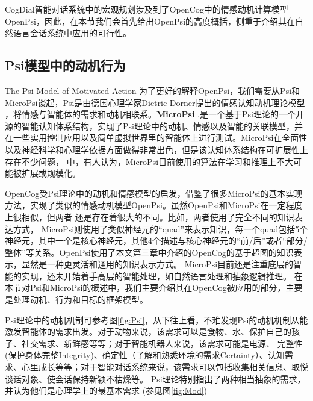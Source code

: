       CogDial智能对话系统中的宏观规划涉及到了OpenCog中的情感动机计算模型OpenPsi，因此，在本节我们会首先给出OpenPsi的高度概括，侧重于介绍其在自然语言会话系统中应用的可行性。

\subsection{Psi模型中的动机行为}{The Psi Model of Motivated Action}
       为了更好的解释OpenPsi，我们需要从Psi和MicroPsi谈起，Psi是由德国心理学家Dietric Dorner提出的情感认知动机理论模型 \cite{Dorner2002}，将情感与智能体的需求和动机相联系。{\bf MicroPsi} \cite{Bach2009},是一个基于Psi理论的一个开源的智能认知体系结构，实现了Psi理论中的动机、情感以及智能的关联模型，并在一些实用控制应用以及简单虚拟世界里的智能体上进行测试。MicroPsi在全面性以及神经科学和心理学依据方面做得非常出色，但是该认知体系结构在可扩展性上存在不少问题， \cite{EGI1}中，有人认为，MicroPsi目前使用的算法在学习和推理上不大可能被扩展或规模化。

       OpenCog受Psi理论中的动机和情感模型的启发，借鉴了很多MicroPsi的基本实现方法，实现了类似的情感动机模型OpenPsi。虽然OpenPsi和MicroPsi在一定程度上很相似，但两者 还是存在着很大的不同。比如，两者使用了完全不同的知识表达方式， MicroPsi则使用了类似神经元的“quad”来表示知识，每一个quad包括5个神经元，其中一个是核心神经元，其他4个描述与核心神经元的“前/后”或者“部分/整体”等关系。OpenPsi使用了本文第三章中介绍的OpenCog的基于超图的知识表示，显然是一种更灵活和通用的知识表示方式。 MicroPsi目前还是注重底层的智能的实现，还未开始着手高层的智能处理，如自然语言处理和抽象逻辑推理。
在本节对Psi和MicroPsi的概述中，我们主要介绍其在OpenCog被应用的部分，主要是处理动机、行为和目标的框架模型。

Psi理论中的动机机制可参考图\ref{fig:Psi}，从下往上看，不难发现Psi的动机机制从能激发智能体的需求出发。对于动物来说，该需求可以是食物、水、保护自己的孩子、社交需求、新鲜感等等；对于智能机器人来说，该需求可能是电源、 完整性(保护身体完整Integrity)、确定性（了解和熟悉环境的需求Certainty）、认知需求、心里成长等等；对于智能对话系统来说，该需求可以包括收集相关信息、取悦谈话对象、使会话保持新颖不枯燥等。
Psi理论特别指出了两种相当抽象的需求，并认为他们是心理学上的最基本需求 (参见图\ref{fig:Mod})

